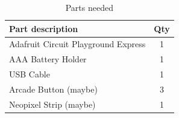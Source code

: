 \documentclass[12pt]{article}
\begin{document}

\begin{table}[ht]
  \caption{Parts needed}
  \label{table:parts_list}
  \begin{center}
  \begin{tabular}{|p{3in}|c|}
  
  \hline
  Part description & Qty\\
  \hline
  \hline
  Adafruit Circuit Playground Express & 1 \\
  \hline
  AAA Battery Holder & 1 \\
  \hline
  USB Cable & 1 \\
  \hline
  Arcade Button (maybe) & 3 \\
  \hline
  Neopixel Strip (maybe) & 1 \\
  \hline
  \end{tabular}
  \end{center}
  \end{table}







  
 
\end{document}
